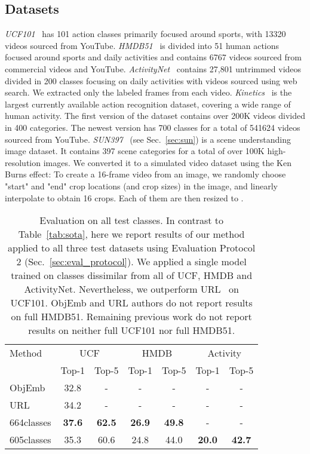 \documentclass[10pt,twocolumn,letterpaper]{article}
\begin{document}
\subsection{Datasets}
\label{sec:datasets}
\textit{UCF101}~\cite{ucf} has 101 action classes primarily focused around sports, with 13320 videos sourced from YouTube.  
\textit{HMDB51}~\cite{hmdb} is divided into 51 human actions focused around sports and daily activities and contains 6767 videos sourced from commercial videos and YouTube.
\textit{ActivityNet}~\cite{activitynet} contains 27,801 untrimmed videos divided in 200 classes focusing on daily activities with videos sourced using web search. We extracted only the labeled frames from each video.
\textit{Kinetics}~\cite{kinetics} is the largest currently available action recognition dataset, covering a wide range of human activity. The first version of the dataset contains over 200K videos divided in 400 categories. The newest version has 700 classes for a total of 541624 videos sourced from YouTube.
\textit{SUN397}~\cite{sun} (see Sec.~\ref{sec:sun}) is a scene understanding image dataset. It contains 397 scene categories for a total of over 100K high-resolution images. We converted it to a simulated video dataset using the Ken Burns effect: To create a 16-frame video from an image, we randomly choose "start" and "end" crop locations (and crop sizes) in the image, and linearly interpolate to obtain 16 crops. Each of them are then resized to .


\begin{table}[t]
    \setlength{\tabcolsep}{3pt}
    \centering
    \begin{tabular}{lcccccc}  
    \toprule
    Method & \multicolumn{2}{c}{UCF}& \multicolumn{2}{c}{HMDB} & \multicolumn{2}{c}{Activity} \\
    \cmidrule(r{4pt}){2-3} \cmidrule(r{4pt}){4-5} \cmidrule(r{4pt}){6-7}
     & Top-1 & Top-5 & Top-1 & Top-5 & Top-1 & Top-5 \\
    \midrule
    ObjEmb~\cite{mettes2017} & 32.8 & - & - & - & - & - \\
    URL~\cite{uar} & 34.2 & - & - & - & - & - \\
    664classes & \textbf{37.6} & \textbf{62.5} & \textbf{26.9} & \textbf{49.8} & - & - \\
    605classes & 35.3 & 60.6 & 24.8 & 44.0 & \textbf{20.0} & \textbf{42.7} \\
    \bottomrule
    \end{tabular}
    \caption{Evaluation on all test classes. In contrast to Table~\ref{tab:sota}, here we report results of our method applied to all three test datasets using Evaluation Protocol 2 (Sec.~\ref{sec:eval_protocol}). We applied a single model trained on classes dissimilar from all of UCF, HMDB and ActivityNet. Nevertheless, we outperform URL~\cite{uar} on UCF101. ObjEmb and URL authors do not report results on full HMDB51. Remaining previous work do not report results on neither full UCF101 nor full HMDB51.}
    \label{tab:allclasses}
\end{table}
\end{document}
